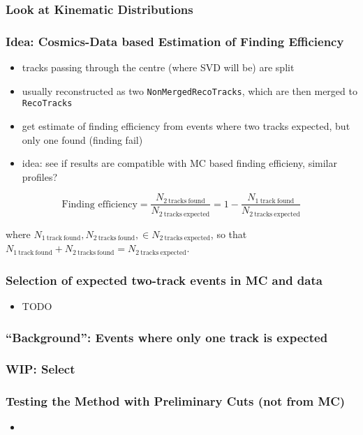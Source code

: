 \documentclass[18pt]{beamer}
\begin{document}
  \begin{frame}
    \frametitle{Look at Kinematic Distributions}
  \end{frame}

  \begin{frame}
    \frametitle{Idea: Cosmics-Data based Estimation of Finding Efficiency}
    \begin{itemize}
    \item tracks passing through the centre (where SVD will be) are split
    \item usually reconstructed as two \lstinline|NonMergedRecoTracks|,
      which are then merged to \lstinline|RecoTracks|
    \item get estimate of finding efficiency from events where two tracks expected, but only one found (finding fail)
    \item idea: see if results are compatible with MC based finding efficieny, similar profiles?
    \end{itemize}

    \begin{equation*}
      \label{eq:cosmic_eff}
      \text{Finding efficiency} = \frac{N_\mathrm{2\ tracks\ found}}{N_\mathrm{2\ tracks\ expected}}
      = 1 - \frac{N_\mathrm{1\ track\ found}}{N_\mathrm{2\ tracks\ expected}}
    \end{equation*}

    where $N_\mathrm{1\ track\ found}, N_\mathrm{2\ tracks\ found}, \in N_\mathrm{2\ tracks\ expected}$, so that $N_\mathrm{1\ track\ found} + N_\mathrm{2\ tracks\ found} = N_\mathrm{2\ tracks\ expected}$.
    
  \end{frame}

  \begin{frame}
    \frametitle{Selection of expected two-track events in MC and data}
    \begin{itemize}
    \item TODO
    \end{itemize}
  \end{frame}

  \begin{frame}    
    \frametitle{``Background'': Events where only one track is expected}
    
  \end{frame}

  \begin{frame}
    \frametitle{WIP: Select }
    
  \end{frame}

  \begin{frame}
    \frametitle{Testing the Method with Preliminary Cuts (not from MC)}
    \begin{itemize}
    \item 
    \end{itemize}
  \end{frame}

  
\end{document}
